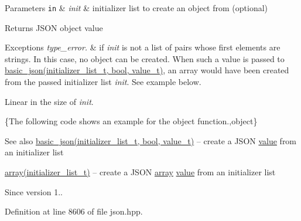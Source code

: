 \begin{DoxyParams}[1]{Parameters}
\mbox{\tt in}  & {\em init} & initializer list to create an object from (optional)\\
\hline
\end{DoxyParams}
\begin{DoxyReturn}{Returns}
J\+S\+ON object value
\end{DoxyReturn}

\begin{DoxyExceptions}{Exceptions}
{\em type\+\_\+error.} & if {\itshape init} is not a list of pairs whose first elements are strings. In this case, no object can be created. When such a value is passed to \hyperlink{classnlohmann_1_1basic__json_ab5dfd9a2b2663b219641cb7fe59b6da2}{basic\+\_\+json(initializer\+\_\+list\+\_\+t, bool, value\+\_\+t)}, an array would have been created from the passed initializer list {\itshape init}. See example below.\\
\hline
\end{DoxyExceptions}
Linear in the size of {\itshape init}.

\{The following code shows an example for the {\ttfamily object} function.,object\}

\begin{DoxySeeAlso}{See also}
\hyperlink{classnlohmann_1_1basic__json_ab5dfd9a2b2663b219641cb7fe59b6da2}{basic\+\_\+json(initializer\+\_\+list\+\_\+t, bool, value\+\_\+t)} -- create a J\+S\+ON \hyperlink{classnlohmann_1_1basic__json_a9fa223b26419f018f9b18cc516e3a8e5}{value} from an initializer list 

\hyperlink{classnlohmann_1_1basic__json_aa80485befaffcadaa39965494e0b4d2e}{array(initializer\+\_\+list\+\_\+t)} -- create a J\+S\+ON \hyperlink{classnlohmann_1_1basic__json_aa80485befaffcadaa39965494e0b4d2e}{array} \hyperlink{classnlohmann_1_1basic__json_a9fa223b26419f018f9b18cc516e3a8e5}{value} from an initializer list
\end{DoxySeeAlso}
\begin{DoxySince}{Since}
version 1.. 
\end{DoxySince}


Definition at line 8606 of file json.\+hpp.

